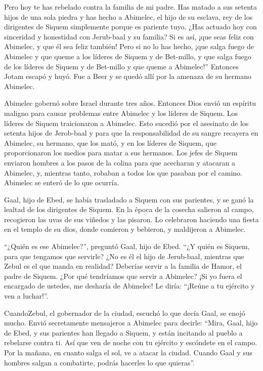  Pero hoy te has rebelado contra la familia de mi padre.
Has matado a sus setenta hijos de una sola piedra y has hecho a
Abimelec, el hijo de su esclava, rey de los dirigentes de Siquem
simplemente porque es pariente tuyo.  ¿Has actuado hoy con
sinceridad y honestidad con Jerub-baal y su familia? Si es así, ¡que
seas feliz con Abimelec, y que él sea feliz también!  Pero
si no lo has hecho, ¡que salga fuego de Abimelec y que queme a los
líderes de Siquem y de Bet-millo, y que salga fuego de los líderes de
Siquem y de Bet-millo y que queme a Abimelec!''  Entonces
Jotam escapó y huyó. Fue a Beer y se quedó allí por la amenaza de su
hermano Abimelec.

 Abimelec gobernó sobre Israel durante tres años.
 Entonces Dios envió un espíritu maligno para causar
problemas entre Abimelec y los líderes de Siquem. Los líderes de Siquem
traicionaron a Abimelec.  Esto sucedió por el asesinato de
los setenta hijos de Jerob-baal y para que la responsabilidad de su
sangre recayera en Abimelec, su hermano, que los mató, y en los líderes
de Siquem, que proporcionaron los medios para matar a sus hermanos.
 Los jefes de Siquem enviaron hombres a los pasos de la
colina para que acecharan y atacaran a Abimelec, y, mientras tanto,
robaban a todos los que pasaban por el camino. Abimelec se enteró de lo
que ocurría.

 Gaal, hijo de Ebed, se había trasladado a Siquem con sus
parientes, y se ganó la lealtad de los dirigentes de Siquem.
 En la época de la cosecha salieron al campo, recogieron
las uvas de sus viñedos y las pisaron. Lo celebraron haciendo una fiesta
en el templo de su dios, donde comieron y bebieron, y maldijeron a
Abimelec.

 ``¿Quién es ese Abimelec?'', preguntó Gaal, hijo de Ebed.
``¿Y quién es Siquem, para que tengamos que servirle? ¿No es él el hijo
de Jerub-baal, mientras que Zebul es el que manda en realidad? Deberías
servir a la familia de Hamor, el padre de Siquem. ¿Por qué tendríamos
que servir a Abimelec?  ¡Si yo fuera el encargado de
ustedes, me desharía de Abimelec! Le diría: ``¡Reúne a tu ejército y ven
a luchar!''.

 CuandoZebul, el gobernador de la ciudad, escuchó lo que
decía Gaal, se enojó mucho.  Envió secretamente mensajeros
a Abimelec para decirle: ``Mira, Gaal, hijo de Ebed, y sus parientes han
llegado a Siquem, y están incitando al pueblo a rebelarse contra ti.
 Así que ven de noche con tu ejército y escóndete en el
campo.  Por la mañana, en cuanto salga el sol, ve a atacar
la ciudad. Cuando Gaal y sus hombres salgan a combatirte, podrás
hacerles lo que quieras''.

